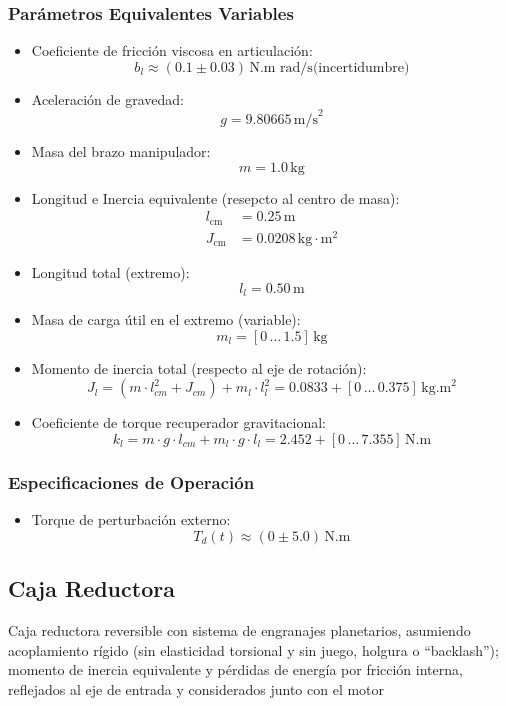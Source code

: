 \documentclass[a4paper, 10pt, journal]{ieeeconf}
\begin{document}
\subsubsection{\textbf{Parámetros Equivalentes Variables}}
\begin{itemize}
    \item Coeficiente de fricción viscosa en articulación:
    \[
    b_l \approx (0.1 \pm 0.03) \, \text{N.m rad/s} \text{(incertidumbre)}
    \]
    \item Aceleración de gravedad:
    \[
    g = 9.80665 \, \text{m/s}^2
    \]
    \item Masa del brazo manipulador:
    \[m = 1.0 \, \text{kg}
    \]
    \item Longitud e Inercia equivalente (resepcto al centro de masa):
    \begin{align*}
    l_{\text{cm}} &= 0.25 \, \text{m} \\
    J_{\text{cm}} &= 0.0208 \, \text{kg}\cdot\text{m}^2
    \end{align*}
    \item Longitud total (extremo):
    \[
    l_l = 0.50 \, \text{m}
    \]
    \item Masa de carga útil en el extremo (variable):
    \[
    m_l = [0 \, \ldots \, 1.5] \, \text{kg}
    \]
    \item Momento de inercia total (respecto al eje de rotación): 
    \[
    J_l = (m \cdot l_{cm}^2 + J_{cm}) + m_l \cdot l_l^2 = 0.0833 + [0 \, \ldots \, 0.375] \, \text{kg.m}^2
    \]
    \item Coeficiente de torque recuperador gravitacional: 
    \[
    k_l = m \cdot g \cdot l_{cm} + m_l \cdot g \cdot l_l = 2.452 + [0 \, \ldots \, 7.355] \, \text{N.m}
    \]
\end{itemize}



\subsubsection{\textbf{Especificaciones de Operación}}
\begin{itemize}
    \item Torque de perturbación externo:
    \[T_d(t) \approx (0 \pm 5.0) \, \text{N.m}
    \]
\end{itemize}



\subsection{\textbf{Caja Reductora}}
Caja reductora reversible con sistema de engranajes planetarios, asumiendo acoplamiento rígido (sin elasticidad torsional y sin juego, holgura o ``backlash''); momento de inercia equivalente y pérdidas de energía por fricción interna, reflejados al eje de entrada y considerados junto con el motor
\bigskip
\end{document}
